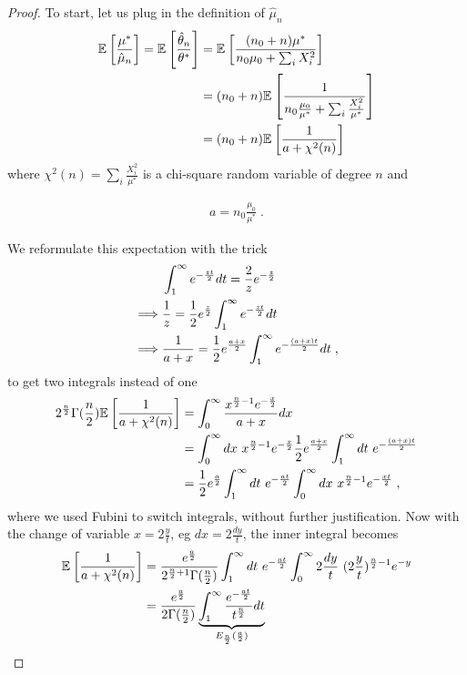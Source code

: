 \documentclass{article}
\newcommand*{\expect}[2][]{\ensuremath{\mathbb{E}_{#1} \left[ #2 \right] }} %
\newcommand{\natp}{\theta}
\newcommand{\MAPm}{\hat \mu_n}
\newcommand{\MAPt}{\hat \natp_n}
\begin{document}
\begin{proof}
	To start, let us plug in the definition of $\MAPm$
	\begin{align}
		\expect{\frac{\mu^*}{\MAPm}} 
		= \expect{\frac{\MAPt}{\natp^*}} 
		&= \expect{\frac{(n_0+n) \mu^*}{n_0 \mu_0 + \sum_i X_i^2}}  \\
		&= (n_0 + n) \expect{\inv{n_0 \frac{\mu_0}{\mu^*}+ \sum_i \frac{X_i^2}{ \mu^*} }} \\
		&= (n_0 +n) \expect{\inv{a + \chi^2(n)}}
	\end{align}
	where $\chi^2(n) = \sum_i \frac{X_i^2}{ \mu^*}$ is a chi-square random variable of degree $n$ and 
\begin{important}
	\begin{align}
			a=n_0 \frac{\mu_0}{\mu^*} \; .
	\end{align}
\end{important}
	We reformulate this expectation with the trick
	\begin{align}
		&\int_1^\infty e^{-\frac{zt}{2}} dt = \frac{2}{z} e^{-\half[z]} \\
		\implies &\inv{z} = \half e^{\half[z]} \int_1^\infty e^{-\frac{zt}{2}} dt \\
		\implies &\inv{a+x} = \half e^{\frac{a+x}{2}} \int_1^\infty e^{- \frac{(a+x)t}{2}}dt \; ,
	\end{align} 
	to get two integrals instead of one
	\begin{align}
		2^{\half[n]}\Gamma(\half[n]) \expect{\inv{a + \chi^2(n)}}  
		&= \int_0^\infty \frac{x^{\frac{n}{2}-1}e^{-\half[x]} }{a+x} dx \\
		&= \int_0^\infty dx\  x^{\frac{n}{2}-1}e^{-\half[x]} \half e^{\half[a+x]} \int_1^\infty  dt\  e^{-\half[(a+x)t]}  \\
		&= \half e^{\half[a]} \int_1^\infty dt \ e^{-\half[a t]}   \int_0^\infty dx \  x^{\frac{n}{2}-1} e^{-\half[x t]}  \; ,
	\end{align}
	where we used Fubini to switch integrals, without further justification.
	Now with the change of variable $x = 2\frac{y}{t}$, eg $dx = 2\frac{dy}{t}$, the inner integral becomes
	\begin{align}
		\expect{\inv{a + \chi^2(n)}}  
		&= \frac{e^{\half[a]} }{2^{\half[n]+1}\Gamma(\half[n]) }\int_1^\infty dt \ e^{-\half[a t]}   \int_0^\infty 2\frac{dy}{t} \  (2\frac{y}{t})^{\frac{n}{2}-1} e^{-y} \\
		&= \frac{e^{\half[a]} }{2\Gamma(\half[n]) } 
		\underbrace{\int_1^\infty  \frac{e^{-\half[a t]}}{t^{\frac{n}{2}}}  dt}_{E_{\half[n]}(\half[a])  } \ 

\end{align}
\end{proof}
\end{document}
